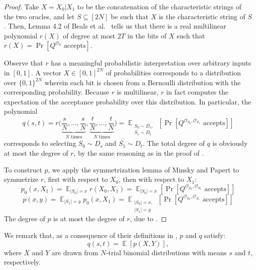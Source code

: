 \documentclass[10pt,a4paper]{article}
\newcommand{\<}{\langle}
\renewcommand{\>}{\rangle}
\DeclareMathOperator{\E}{\mathbb E}
\begin{document}
\begin{proof}
Take $X = X_0|X_1$ to be the concatenation of the characteristic strings of the two oracles, and let $S \subseteq [2N]$ be such that $X$ is the characteristic string of $S$. Then, Lemma 4.2 of Beals et al.\ \cite{bbcmw} tells us that there is a real multilinear polynomial $r(X)$ of degree at most $2T$ in the bits of $X$ such that $r(X) = \Pr[ Q^{\mathcal{O}_S} \text{ accepts}]$.

Observe that $r$ has a meaningful probabilistic interpretation over arbitrary inputs in $[0, 1]$. A vector $X \in [0, 1]^{2N}$ of probabilities corresponds to a distribution over $\{0,1\}^{2N}$ wherein each bit is chosen from a Bernoulli distribution with the corresponding probability. Because $r$ is multilinear, $r$ in fact computes the expectation of the acceptance probability over this distribution. In particular, the polynomial
\begin{equation}
q(s, t) = r\bigg(\underbrace{\frac{s}{N},\ldots,\frac{s}{N}}_{N \text{ times}}, \underbrace{\frac{t}{N},\ldots,\frac{t}{N}}_{N \text{ times}}\bigg) = \E_{\substack{S_0 \sim D_s,\\S_1 \sim D_t}}\left[\Pr[ Q^{\mathcal{O}_{S_0},\mathcal{O}_{S_1}} \text{ accepts}] \right]    
\end{equation}
corresponds to selecting $S_0 \sim D_s$ and $S_1 \sim D_t$. The total degree of $q$ is obviously
at most the degree of $r$, by the same reasoning as in the proof of .

To construct $p$, we apply the symmetrization lemma of Minsky and Papert \cite{mp} to symmetrize $r$, first with respect to $X_0$, then with respect to $X_1$:
\begin{equation}
    p_0(x, X_1) = \E_{|S_0|=x} r(X_0,X_1) =  \E_{|S_0|=x}\left[\Pr[ Q^{\mathcal{O}_{S_0},\mathcal{O}_{S_1}} \text{ accepts}] \right]
\end{equation}
\begin{equation}
    p(x, y) = \E_{|S_1|=y} p_0(x,X_1) = \E_{\substack{|S_0|=x,\\|S_1|=y}}\left[\Pr[ Q^{\mathcal{O}_{S_0},\mathcal{O}_{S_1}} \text{ accepts}] \right] 
\end{equation}  
The degree of $p$ is at most the degree of $r$, due to .
\end{proof}


We remark that, as a consequence of their definitions in , $p$ and $q$ satisfy:
\begin{equation}
q(s, t) = \E \left[ p(X, Y) \right],
\end{equation}
where $X$ and $Y$ are drawn from $N$-trial binomial distributions with means $s$ and $t$, respectively.
\end{document}

